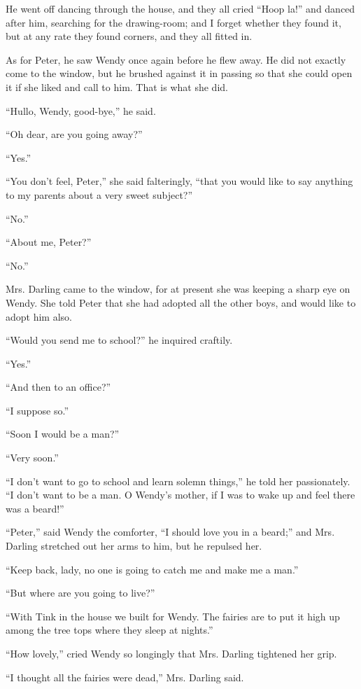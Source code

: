 He went off dancing through the house, and they all cried ``Hoop la!''
and danced after him, searching for the drawing-room; and I forget
whether they found it, but at any rate they found corners, and they all
fitted in.

As for Peter, he saw Wendy once again before he flew away. He did not
exactly come to the window, but he brushed against it in passing so
that she could open it if she liked and call to him. That is what she
did.

``Hullo, Wendy, good-bye,'' he said.

``Oh dear, are you going away?''

``Yes.''

``You don't feel, Peter,'' she said falteringly, ``that you would like to
say anything to my parents about a very sweet subject?''

``No.''

``About me, Peter?''

``No.''

Mrs. Darling came to the window, for at present she was keeping a sharp
eye on Wendy. She told Peter that she had adopted all the other boys,
and would like to adopt him also.

``Would you send me to school?'' he inquired craftily.

``Yes.''

``And then to an office?''

``I suppose so.''

``Soon I would be a man?''

``Very soon.''

``I don't want to go to school and learn solemn things,'' he told her
passionately. ``I don't want to be a man. O Wendy's mother, if I was to
wake up and feel there was a beard!''

``Peter,'' said Wendy the comforter, ``I should love you in a beard;'' and
Mrs. Darling stretched out her arms to him, but he repulsed her.

``Keep back, lady, no one is going to catch me and make me a man.''

``But where are you going to live?''

``With Tink in the house we built for Wendy. The fairies are to put it
high up among the tree tops where they sleep at nights.''

``How lovely,'' cried Wendy so longingly that Mrs. Darling tightened her
grip.

``I thought all the fairies were dead,'' Mrs. Darling said.

